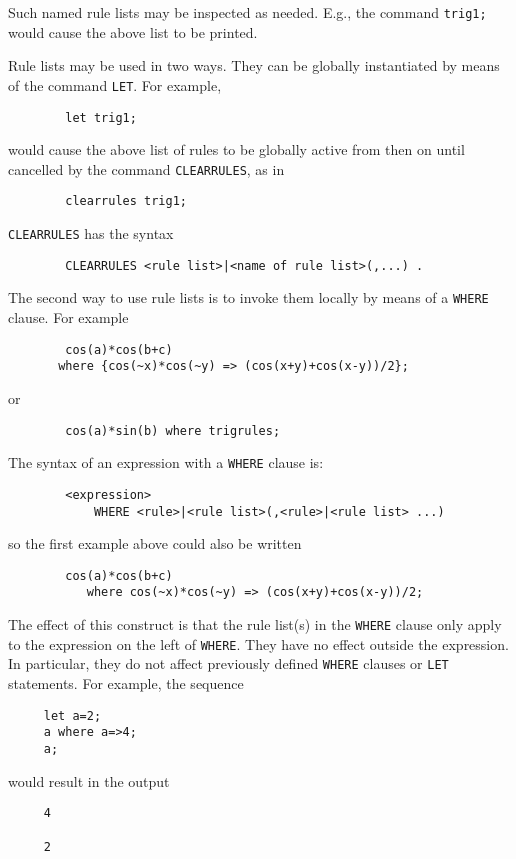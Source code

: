 Such named rule lists may be inspected as needed. E.g., the command
{\tt trig1;} would cause the above list to be printed.

\hypertarget{CLEARRULES}{}
Rule lists may be used in two ways.  They can be globally instantiated by
means of the command {\tt LET}. For example,
\begin{verbatim}
        let trig1;
\end{verbatim}
would cause the above list of rules to be globally active from then on until
cancelled by the command {\tt CLEARRULES}, as in
\begin{verbatim}
        clearrules trig1;
\end{verbatim}
{\tt CLEARRULES} has the syntax
\begin{verbatim}
        CLEARRULES <rule list>|<name of rule list>(,...) .
\end{verbatim}

\hypertarget{operator:WHERE}{}
The second way to use rule lists is to invoke them locally by means of a
{\tt WHERE} clause.  For example
\begin{verbatim}
        cos(a)*cos(b+c)
	   where {cos(~x)*cos(~y) => (cos(x+y)+cos(x-y))/2};
\end{verbatim}
or
\begin{verbatim}
        cos(a)*sin(b) where trigrules;
\end{verbatim}

The syntax of an expression with a {\tt WHERE} clause is:
\begin{verbatim}
        <expression>
            WHERE <rule>|<rule list>(,<rule>|<rule list> ...)
\end{verbatim}
so the first example above could also be written
\begin{verbatim}
        cos(a)*cos(b+c)
           where cos(~x)*cos(~y) => (cos(x+y)+cos(x-y))/2;
\end{verbatim}

The effect of this construct is that the rule list(s) in the {\tt WHERE}
clause only apply to the expression on the left of {\tt WHERE}.  They have
no effect outside the expression.  In particular, they do not affect
previously defined {\tt WHERE} clauses or {\tt LET} statements.  For
example, the sequence
\begin{verbatim}
     let a=2;
     a where a=>4;
     a;
\end{verbatim}
would result in the output
\begin{verbatim}
     4

     2
\end{verbatim}

